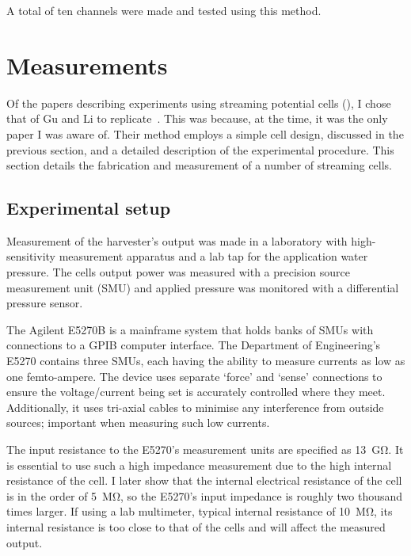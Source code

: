       A total of ten channels were made and tested using this method.


\section{Measurements}


  Of the papers describing experiments using streaming potential cells (\cite{Gu2000,Mala1997,Scales1992,VanderHeyden2006}), I chose that of Gu and Li to replicate~\cite{Gu2000}.
  This was because, at the time, it was the only paper I was aware of.
  Their method employs a simple cell design, discussed in the previous section, and a detailed description of the experimental procedure.
  This section details the fabrication and measurement of a number of streaming cells.


  \subsection{\label{sub:Experimental-Procedure}Experimental setup}


    Measurement of the harvester's output was made in a laboratory with high-sensitivity measurement apparatus and a lab tap for the application water pressure.
    The cells output power was measured with a precision source measurement unit (SMU) and applied pressure was monitored with a differential pressure sensor.

    The Agilent E5270B is a mainframe system that holds banks of SMUs with connections to a GPIB computer interface.
    The Department of Engineering's E5270 contains three SMUs, each having the ability to measure currents as low as one femto-ampere.
    The device uses separate `force' and `sense' connections to ensure the voltage/current being set is accurately controlled where they meet.
    Additionally, it uses tri-axial cables to minimise any interference from outside sources; important when measuring such low currents.

    The input resistance to the E5270's measurement units are specified as \SI{13}{\giga\ohm}.
    It is essential to use such a high impedance measurement due to the high internal resistance of the cell.
    I later show that the internal electrical resistance of the cell is in the order of \SI{5}{\mega\ohm}, so the E5270's input impedance is roughly two thousand times larger.
    If using a lab multimeter, typical internal resistance of \SI{10}{\mega\ohm}, its internal resistance is too close to that of the cells and will affect the measured output.

